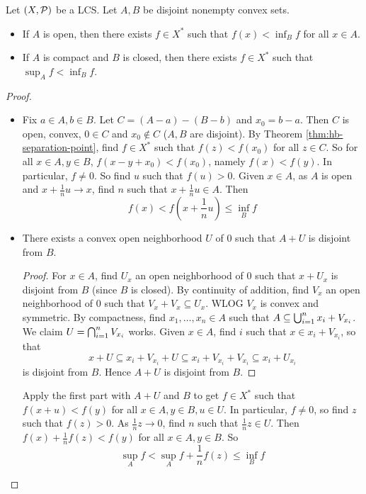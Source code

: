 \documentclass{article}
\begin{document}
\begin{thm}\label{thm:hb-separation-set}
  Let $(X, \mathcal P)$ be a LCS. Let $A, B$ be disjoint nonempty convex sets.
  \begin{itemize}
    \item If $A$ is open, then there exists $f \in X^*$ such that $f(x) < \inf_B f$ for all $x \in A$.
    \item If $A$ is compact and $B$ is closed, then there exists $f \in X^*$ such that $\sup_A f < \inf_B f$.
  \end{itemize}
\end{thm}
\begin{proof}~
  \begin{itemize}
    \item Fix $a \in A, b \in B$. Let $C = (A - a) - (B - b)$ and $x_0 = b - a$. Then $C$ is open, convex, $0 \in C$ and $x_0 \nin C$ ($A, B$ are disjoint). By Theorem \ref{thm:hb-separation-point}, find $f \in X^*$ such that $f(z) < f(x_0)$ for all $z \in C$. So for all $x \in A, y \in B$, $f(x - y + x_0) < f(x_0)$, namely $f(x) < f(y)$. In particular, $f \ne 0$. So find $u$ such that $f(u) > 0$. Given $x \in A$, as $A$ is open and $x + \frac 1n u \to x$, find $n$ such that $x + \frac 1n u \in A$. Then
    $$f(x) < f\left(x + \frac 1n u\right) \le \inf_B f$$
  \item
  \begin{claim}
    There exists a convex open neighborhood $U$ of $0$ such that $A + U$ is disjoint from $B$.
  \end{claim}
  \begin{proof}
    For $x \in A$, find $U_x$ an open neighborhood of $0$ such that $x + U_x$ is disjoint from $B$ (since $B$ is closed). By continuity of addition, find $V_x$ an open neighborhood of $0$ such that $V_x + V_x \subseteq U_x$. WLOG $V_x$ is convex and symmetric. By compactness, find $x_1, \dots, x_n \in A$ such that $A \subseteq \bigcup_{i = 1}^n x_i + V_{x_i}$. We claim $U = \bigcap_{i = 1}^n V_{x_i}$ works. Given $x \in A$, find $i$ such that $x \in x_i + V_{x_i}$, so that
    $$x + U \subseteq x_i + V_{x_i} + U \subseteq x_i + V_{x_i} + V_{x_i} \subseteq x_i + U_{x_i}$$
    is disjoint from $B$. Hence $A + U$ is disjoint from $B$.
  \end{proof}
  Apply the first part with $A + U$ and $B$ to get $f \in X^*$ such that $f(x + u) < f(y)$ for all $x \in A, y \in B, u \in U$. In particular, $f \ne 0$, so find $z$ such that $f(z) > 0$. As $\frac 1n z \to 0$, find $n$ such that $\frac 1n z \in U$. Then $f(x) + \frac 1n f(z) < f(y)$ for all $x \in A, y \in B$. So
  $$\sup_A f < \sup_A f + \frac 1n f(z) \le \inf_B f$$
  \end{itemize}
\end{proof}
\end{document}
